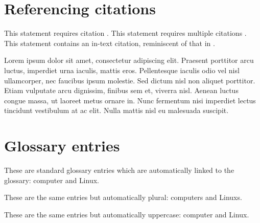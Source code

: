 \documentclass[
]{HyperedReport}
\begin{document}

\newpage

\section{Referencing citations}

This statement requires citation \autocite{Smith:2019qr}. This statement requires multiple citations \autocite{Smith:2019qr, Smith:2021jd}. This statement contains an in-text citation, reminiscent of that in \textcite{Smith:2021jd}.

Lorem ipsum dolor sit amet, consectetur adipiscing elit. Praesent porttitor arcu luctus, imperdiet urna iaculis, mattis eros. Pellentesque iaculis odio vel nisl ullamcorper, nec faucibus ipsum molestie. Sed dictum nisl non aliquet porttitor. Etiam vulputate arcu dignissim, finibus sem et, viverra nisl. Aenean luctus congue massa, ut laoreet metus ornare in. Nunc fermentum nisi imperdiet lectus tincidunt vestibulum at ac elit. Nulla mattis nisl eu malesuada suscipit.

\section{Glossary entries}

These are standard glossary entries which are automatically linked to the glossary: \gls{computer} and \gls{Linux}.

These are the same entries but automatically plural: \glspl{computer} and \glspl{Linux}.

These are the same entries but automatically uppercase: \Gls{computer} and \Gls{Linux}.


\newpage

\begin{fullwidth} %
	\printbibliography[title={Bibliography}] %
\end{fullwidth}

\end{document}
